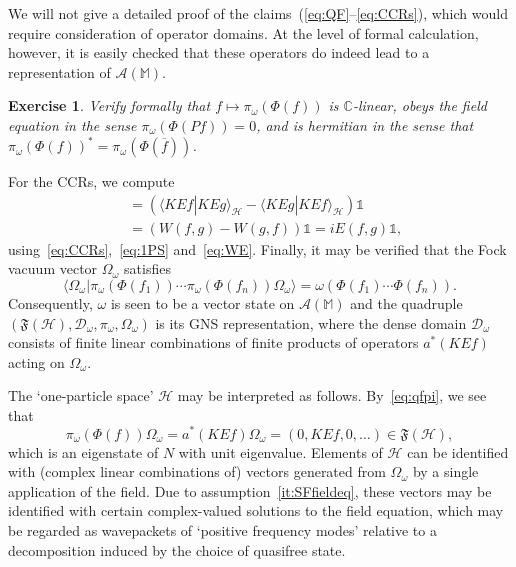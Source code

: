 \documentclass[12pt,a4paper]{article}
\newcommand{\1}{\mathds{1}}                         %
\newcommand{\CC}{\mathbb{C}}           %
\newcommand{\MM}{\mathbb{M}}
\newcommand{\FF}{{\mathfrak{F}}}
\newcommand{\HH}{{\mathcal{H}}}
\newcommand{\DD}{{\mathscr{D}}}
\newcommand{\II}{{\mathbb{1}}}
\newcommand{\Ac}{{\mathcal{A}}}
\newcommand{\ip}[2]{\langle #1|#2\rangle}
\newtheorem{exercise}[theorem]{Exercise}
\begin{document}
We will not give a detailed proof of the claims~(\ref{eq:QF}--\ref{eq:CCRs}), which would require consideration of operator domains.
At the level of formal calculation, however, it is easily checked that these operators do indeed lead to a representation of $\Ac(\MM)$.
\begin{exercise} Verify formally that $f\mapsto \pi_\omega(\Phi(f))$ is $\CC$-linear, obeys the field equation in the sense $\pi_\omega(\Phi(Pf))=0$, and is hermitian in the sense that $\pi_\omega(\Phi(f))^*=\pi_\omega(\Phi(\overline{f}))$.
\end{exercise}
For the CCRs, we compute
\begin{align*}
[\pi_\omega(\Phi(f)),\pi_\omega(\Phi(g))] &= \left(\ip{KEf}{KEg}_\HH - \ip{KEg}{KEf}_\HH\right)\II\\
&= \left(W(f,g)-W(g,f)\right)\II = iE(f,g)\II,
\end{align*}
using~\eqref{eq:CCRs},~\eqref{eq:1PS} and~\eqref{eq:WE}. Finally, 
it may be verified that the Fock vacuum vector $\Omega_\omega$ satisfies
\[
\ip{\Omega_\omega}{\pi_\omega(\Phi(f_1))\cdots \pi_\omega(\Phi(f_n))\Omega_\omega} = \omega(\Phi(f_1)\cdots \Phi(f_n)).
\]
Consequently, $\omega$ is seen to be a vector state on $\Ac(\MM)$ 
and the quadruple $(\FF(\HH), \DD_\omega,\pi_\omega,\Omega_\omega)$ is its GNS representation, where
the dense domain $\DD_\omega$ consists of finite linear combinations of finite products of operators $a^*(KEf)$ acting on $\Omega_\omega$.

The `one-particle space' $\HH$ may be interpreted as follows.  By~\eqref{eq:qfpi}, we see that
\[
\pi_\omega(\Phi(f))\Omega_\omega = a^*(KEf)\Omega_\omega = (0,KEf,0,\ldots)\in\FF(\HH) ,
\]
which is an eigenstate of $N$ with unit eigenvalue. Elements of $\HH$ can be identified with (complex linear combinations of) vectors generated from $\Omega_\omega$ by a single application of the field. Due to assumption~\ref{it:SFfieldeq}, these vectors may be identified with certain complex-valued solutions to the field equation, which may be regarded as wavepackets of `positive frequency modes' relative to a decomposition induced by the choice of quasifree state. 
\end{document}
